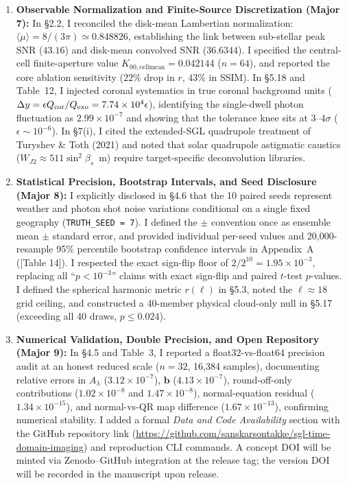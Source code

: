 \documentclass[11pt]{article}
\begin{document}
\begin{enumerate}
    \item \textbf{Observable Normalization and Finite-Source Discretization (Major 7):}
    In §2.2, I reconciled the disk-mean Lambertian normalization: $\langle\mu\rangle = 8/(3\pi) \simeq 0.848826$, establishing the link between sub-stellar peak SNR ($43.16$) and disk-mean convolved SNR ($36.6344$). I specified the central-cell finite-aperture value $K_{00,\mathrm{cellmean}} = 0.042144$ ($n=64$), and reported the core ablation sensitivity ($22\%$ drop in $r$, $43\%$ in SSIM). In §5.18 and Table~12, I injected coronal systematics in true coronal background units ($\Delta y = \epsilon Q_{\rm cor}/Q_{\rm exo} = 7.74\times 10^4 \epsilon$), identifying the single-dwell photon fluctuation as $2.99\times 10^{-7}$ and showing that the tolerance knee sits at $3$--$4\sigma$ ($\epsilon \sim 10^{-6}$). In §7(i), I cited the extended-SGL quadrupole treatment of Turyshev \& Toth (2021) and noted that solar quadrupole astigmatic caustics ($W_{J2} \approx 511\sin^2\beta_s$~m) require target-specific deconvolution libraries.

    \item \textbf{Statistical Precision, Bootstrap Intervals, and Seed Disclosure (Major 8):}
    I explicitly disclosed in §4.6 that the 10 paired seeds represent weather and photon shot noise variations conditional on a single fixed geography (\texttt{TRUTH\_SEED = 7}). I defined the $\pm$ convention once as ensemble mean $\pm$ standard error, and provided individual per-seed values and 20,000-resample 95\% percentile bootstrap confidence intervals in Appendix~A ([Table 14]). I respected the exact sign-flip floor of $2/2^{10} = 1.95\times 10^{-3}$, replacing all ``$p < 10^{-3}$'' claims with exact sign-flip and paired $t$-test $p$-values. I defined the spherical harmonic metric $r(\ell)$ in §5.3, noted the $\ell \approx 18$ grid ceiling, and constructed a 40-member physical cloud-only null in §5.17 (exceeding all 40 draws, $p \le 0.024$).

    \item \textbf{Numerical Validation, Double Precision, and Open Repository (Major 9):}
    In §4.5 and Table~3, I reported a float32-vs-float64 precision audit at an honest reduced scale ($n=32$, 16,384 samples), documenting relative errors in $A_\lambda$ ($3.12\times 10^{-7}$), $\mathbf{b}$ ($4.13\times 10^{-7}$), round-off-only contributions ($1.02\times 10^{-8}$ and $1.47\times 10^{-8}$), normal-equation residual ($1.34\times 10^{-15}$), and normal-vs-QR map difference ($1.67\times 10^{-13}$), confirming numerical stability. I added a formal \textit{Data and Code Availability} section with the GitHub repository link (\url{https://github.com/sanskarsontakke/sgl-time-domain-imaging}) and reproduction CLI commands. A concept DOI will be minted via Zenodo--GitHub integration at the release tag; the version DOI will be recorded in the manuscript upon release.


\end{enumerate}
\end{document}
